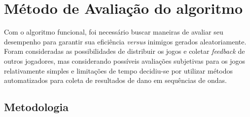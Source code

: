 













\chapter{Método de Avaliação do algoritmo}
\label{cap:testes}

Com o algoritmo funcional, foi necessário buscar maneiras de avaliar seu desempenho para garantir sua eficiência \textit{versus} inimigos gerados aleatoriamente. Foram consideradas as possibilidades de distribuir os jogos e coletar \textit{feedback} de outros jogadores, mas considerando possíveis avaliações subjetivas para os jogos relativamente simples e limitações de tempo decidiu-se por utilizar métodos automatizados para coleta de resultados de dano em sequências de ondas.

\section{Metodologia}
\label{sec:t-metodologia}

